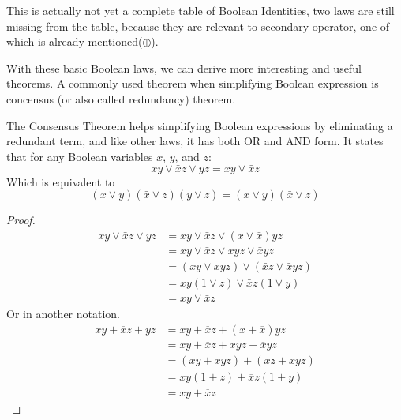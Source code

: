         This is actually not yet a complete table of Boolean Identities, two laws are still missing
        from the table, because they are relevant to secondary operator, one of which is already mentioned($\oplus$).

        With these basic Boolean laws, we can derive more interesting and useful theorems. A commonly used theorem when simplifying
        Boolean expression is concensus (or also called redundancy) theorem.
        \begin{theorem}
            The Consensus Theorem helps simplifying Boolean expressions by eliminating a redundant term, and like other laws, it has both
            OR and AND form. 
            It states that for any Boolean variables $x$, $y$, and $z$:
            \begin{equation*}
                xy\lor\bar{x}z\lor yz=xy\lor\bar{x}z
            \end{equation*}
            Which is equivalent to
            \begin{equation*}
                (x\lor y)(\bar{x}\lor z)(y\lor z)=(x\lor y)(\bar{x}\lor z)
            \end{equation*}
        \end{theorem}
        \begin{proof}
            $$\begin{aligned}
                xy\lor\bar{x}z\lor yz& =xy\lor\bar{x}z\lor(x\lor\bar{x})yz  \\
                &=xy\lor\bar{x}z\lor xyz\lor\bar{x}yz \\
                &=(xy\lor xyz)\lor(\bar{x}z\lor\bar{x}yz) \\
                &=xy(1\lor z)\lor\bar{x}z(1\lor y) \\
                &=xy\lor\bar{x}z
                \end{aligned}$$
            Or in another notation.
            $$\begin{aligned}
                xy + \overline{x}z + yz &= xy + \overline{x}z + (x + \overline{x})yz \\
                &= xy + \overline{x}z + xyz + \overline{x}yz \\
                &= (xy + xyz) + (\overline{x}z + \overline{x}yz) \\
                &= xy(1 + z) + \overline{x}z(1 + y) \\
                &= xy + \overline{x}z
                \end{aligned}$$
        \end{proof}


